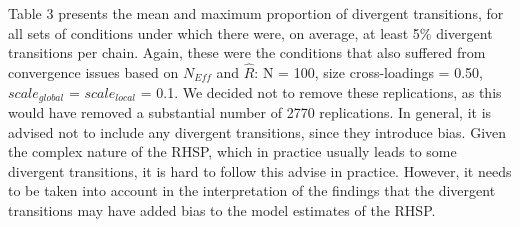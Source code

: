 \documentclass[
  man, donotrepeattitle,floatsintext]{apa6}
\begin{document}
Table 3 presents the mean and maximum proportion of divergent transitions, for all sets of conditions under which there were, on average, at least 5\% divergent transitions per chain. Again, these were the conditions that also suffered from convergence issues based on \(N_{Eff}\) and \(\hat{R}\): N = 100, size cross-loadings = 0.50, \(scale_{global}\) = \(scale_{local}\) = 0.1. We decided not to remove these replications, as this would have removed a substantial number of 2770 replications. In general, it is advised not to include any divergent transitions, since they introduce bias. Given the complex nature of the RHSP, which in practice usually leads to some divergent transitions, it is hard to follow this advise in practice. However, it needs to be taken into account in the interpretation of the findings that the divergent transitions may have added bias to the model estimates of the RHSP.
\end{document}
